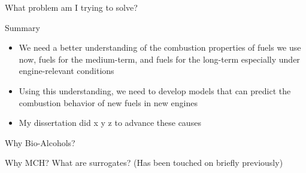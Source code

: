 \documentclass{beamer}
\begin{document}
\begin{frame}{What problem am I trying to solve?}
    \begin{center}
    \end{center}
\end{frame}

\begin{frame}{Summary}
    \begin{itemize}
        \item We need a better understanding of the combustion properties of fuels we use now, fuels for the medium-term, and fuels for the long-term especially under engine-relevant conditions
        \item Using this understanding, we need to develop models that can predict the combustion behavior of new fuels in new engines
        \item My dissertation did x y z to advance these causes
    \end{itemize}
\end{frame}

\begin{frame}{Why Bio-Alcohols?}
\end{frame}

\begin{frame}{Why MCH?}
What are surrogates? (Has been touched on briefly previously)
\end{frame}
\end{document}
